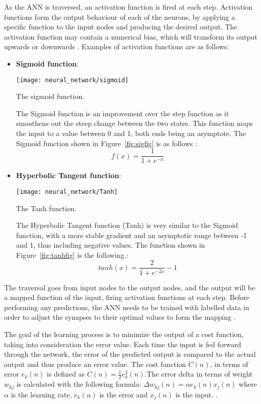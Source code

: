 As the ANN is traversed, an activation function is fired at each step. Activation functions form the output behaviour of each of the neurons, by applying a specific function to the input nodes and producing the desired output. The activation function may contain a numerical bias, which will transform its output upwards or downwards \citep{jain1996artificial}. Examples of activation functions are as follows:
\begin{itemize}
	
	\item\textbf{Sigmoid function}:
	\begin{marginfigure}%
		\texttt{[image: neural\_network/sigmoid]}
		\caption{The sigmoid function.}
		\label{fig:sigfig}
	\end{marginfigure} The Sigmoid function is an improvement over the step function as it smoothens out the steep change between the two states. This function maps the input to a value between 0 and 1, both ends being an asymptote. The Sigmoid function shown in Figure~\ref{fig:sigfig} is as follows \citep{Haykin:1994:NNC:541500}: $$f(x) = \frac{1}{1+e^{-x}}$$
	
	\item\textbf{Hyperbolic Tangent function}:
	\begin{marginfigure}%
		\texttt{[image: neural\_network/Tanh]}
		\caption{The Tanh function.}
		\label{fig:tanhfig}
	\end{marginfigure}
	The Hyperbolic Tangent function (Tanh) is very similar to the Sigmoid function, with a more stable gradient and an asymptotic range between -1 and 1, thus including negative values. The function shown in Figure~\ref{fig:tanhfig} is the following \citep{Abdelsalam:2017:AEH:3020078.3021768}: $$tanh(x) = \frac{2}{1+e^{-2x}}-1 $$
	
\end{itemize}
The traversal goes from input nodes to the output nodes, and the output will be a mapped function of the input, firing activation functions at each step. Before performing any predictions, the ANN needs to be trained with labelled data in order to adjust the synapses to their optimal values to form the mapping \citep{GURESEN2011426}. 

The goal of the learning process is to minimize the output of a cost function, taking into consideration the error value. Each time the input is fed forward through the network, the error of the predicted output is compared to the actual output and thus produce an error value. The cost function $C(n)$, in terms of error $e_k(n)$ is defined as $C(n) = \frac{1}{2}e^2_k(n)$.The error delta in terms of weight $w_{kj}$ is calculated with the following formula: $\Delta w_{kj}(n) = \alpha e_k(n)x_j(n)$ where $\alpha$ is the learning rate, $e_k(n)$ is the error and $x_j(n)$ is the input.  \citep{doi:10.1080/02626669809492102}. 

